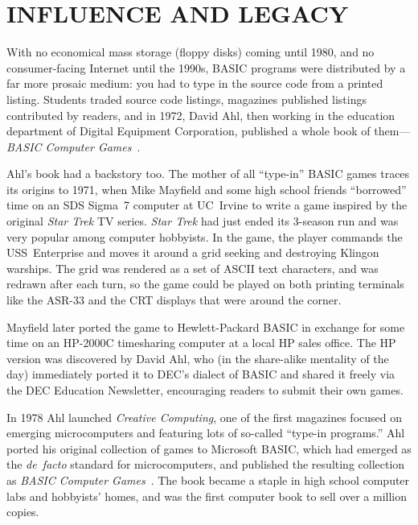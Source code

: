 

\section{INFLUENCE AND LEGACY}


With no economical mass storage (floppy disks) coming until 1980, and no
consumer-facing Internet until the 1990s, BASIC programs were
distributed by a far more prosaic medium: you had to type in the source
code from a printed listing.  Students traded source code listings, 
magazines published listings contributed by readers, and in 1972, David
Ahl, then working in the education department of Digital Equipment
Corporation, published a whole book of them---\emph{BASIC Computer
  Games}~\cite{basic_computer_games}. 

Ahl's book had a backstory too.
The mother of all ``type-in'' BASIC games traces its origins to
1971, when Mike Mayfield and some high school friends ``borrowed'' time
on an SDS Sigma~7 computer at UC~Irvine to write a game inspired by the
original \emph{Star Trek} TV series.  \emph{Star Trek} had just ended its 3-season run and
was very popular among computer hobbyists.
In the game, the player commands the USS~Enterprise and moves it around
a grid seeking and destroying Klingon warships.  The grid was rendered
as a set of ASCII text characters, and was redrawn after each turn, so
the game could be played on both printing terminals like the ASR-33 and
the CRT displays that were around the corner.

Mayfield later ported the game to Hewlett-Packard BASIC in exchange for
some time on an HP-2000C timesharing computer at a local HP sales
office.
The HP version was discovered by David Ahl, who (in the share-alike mentality of the day)
immediately ported it to DEC's dialect of BASIC and shared it freely via the DEC
Education Newsletter, encouraging readers to submit their own games.

In 1978 Ahl launched \emph{Creative Computing}, one of the first
magazines focused on emerging microcomputers and featuring lots of
so-called ``type-in programs.''
Ahl ported his original collection of games
to Microsoft BASIC, which had emerged as the
\emph{de~facto} standard for microcomputers, and published the
resulting collection as \emph{BASIC Computer
Games}~\cite{basic_computer_games}.
The book became a staple in high school computer labs and hobbyists'
homes, and was the first computer book to sell over a million copies.

